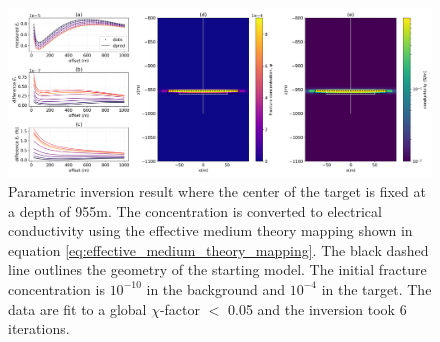 \begin{figure}
    \begin{center}
    \includegraphics[width=\textwidth]{figures/inversion/dc_parametric_inversion_phi_correctz0_large_r.png}
    \end{center}
\caption{
    Parametric inversion result where the center of the target is fixed at a depth
    of 955m. The concentration is
    converted to electrical conductivity using the effective medium theory mapping shown in
    equation \ref{eq:effective_medium_theory_mapping}.
    The black dashed line outlines the geometry of the starting model. The initial fracture concentration
    is $10^{-10}$ in the background and $10^{-4}$ in the target.
    The data are fit to a global $\chi$-factor $<$ 0.05 and the inversion took 6 iterations.
}
\label{fig:dc_parametric_inversion_phi_correctz0_large_r}
\end{figure}
